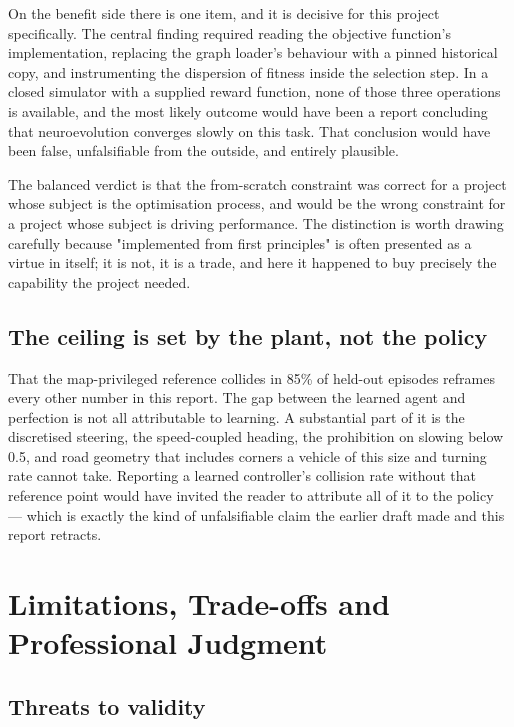 \documentclass[conference]{IEEEtran}
\begin{document}
On the benefit side there is one item, and it is decisive for this project specifically. The central finding required reading the objective function's implementation, replacing the graph loader's behaviour with a pinned historical copy, and instrumenting the dispersion of fitness inside the selection step. In a closed simulator with a supplied reward function, none of those three operations is available, and the most likely outcome would have been a report concluding that neuroevolution converges slowly on this task. That conclusion would have been false, unfalsifiable from the outside, and entirely plausible.

The balanced verdict is that the from-scratch constraint was correct for a project whose subject is the optimisation process, and would be the wrong constraint for a project whose subject is driving performance. The distinction is worth drawing carefully because "implemented from first principles" is often presented as a virtue in itself; it is not, it is a trade, and here it happened to buy precisely the capability the project needed.

\subsection{The ceiling is set by the plant, not the policy}

That the map-privileged reference collides in 85\% of held-out episodes reframes every other number in this report. The gap between the learned agent and perfection is not all attributable to learning. A substantial part of it is the discretised steering, the speed-coupled heading, the prohibition on slowing below 0.5, and road geometry that includes corners a vehicle of this size and turning rate cannot take. Reporting a learned controller's collision rate without that reference point would have invited the reader to attribute all of it to the policy — which is exactly the kind of unfalsifiable claim the earlier draft made and this report retracts.

\section{Limitations, Trade-offs and Professional Judgment}

\label{sec:limitations}

\subsection{Threats to validity}
\end{document}
